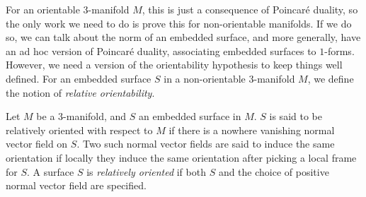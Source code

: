 For an orientable $3$-manifold $M$, this is just a consequence of Poincar\'e duality, so the only
work we need to do is prove this for non-orientable manifolds. If we do so, we can talk about the
norm of an embedded surface, and more generally, have an ad hoc version of Poincar\'e duality,
associating embedded surfaces to $1$-forms. However, we need a version of the orientability
hypothesis to keep things well defined. For an embedded surface $S$ in a non-orientable
$3$-manifold $M$, we define the notion of \emph{relative orientability}.

\begin{defn}
  Let $M$ be a $3$-manifold, and $S$ an embedded surface in $M$. $S$ is said to be relatively
  oriented with respect to $M$ if there is a nowhere vanishing normal vector field on $S$. Two
  such normal vector fields are said to induce the same orientation if locally they induce the
  same orientation after picking a local frame for $S$. A surface $S$ is \emph{relatively oriented}
  if both $S$ and the choice of positive normal vector field are specified.
\end{defn}

